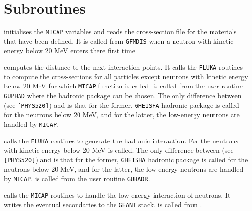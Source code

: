  
\section{Subroutines}

 initialises the {\tt MICAP} variables and
reads the cross-section file for the materials that have been
defined. It is called from {\tt GFMDIS} when a neutron with
kinetic energy below 20 MeV enters there first time.


 computes the distance to the next interaction
points. It calls the {\tt FLUKA} routines to compute the
cross-sections for all particles except neutrons with
kinetic energy below 20 MeV for which {\tt MICAP}
function  is called.
 is called from the user routine {\tt GUPHAD}
where the hadronic package can be chosen.
The only difference between  (see {\tt [PHYS520]})
and 
is that for the former, {\tt GHEISHA} hadronic package
is called for the neutrons below 20 MeV, and for the latter,
the low-energy neutrons are handled by {\tt MICAP}.

 calls the {\tt FLUKA} routines to
generate the hadronic interaction. For the neutrons
with kinetic energy below 20 MeV 
is called. 
The only difference between  (see {\tt [PHYS520]})
and 
is that for the former, {\tt GHEISHA} hadronic package
is called for the neutrons below 20 MeV, and for the latter,
the low-energy neutrons are handled by {\tt MICAP}.
 is called from the user routine {\tt GUHADR}.

 calls the {\tt MICAP} routines to
handle the low-energy interaction of neutrons.
It writes the eventual secondaries to the {\tt GEANT}
stack.  is called from .

